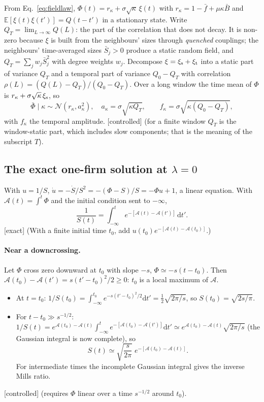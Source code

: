 \documentclass[11pt]{article}
\newcommand{\E}{\mathbb E}
\newcommand{\Sb}{\bar S}
\newcommand{\fb}{\bar f}
\newcommand{\dd}{\mathrm d}
\newcommand{\exact}{\textsf{\small[exact]}}
\newcommand{\controlled}{\textsf{\small[controlled]}}
\begin{document}
From Eq.~\eqref{eq:fieldlaw}, $\Phi(t)=r_\kappa+\sigma\sqrt\kappa\,\xi(t)$ with $r_\kappa=1-\fb+\mu\kappa\bar B$ and
$\E[\xi(t)\xi(t')]=Q(t-t')$ in a stationary state.  Write $Q_T=\lim_{L\to\infty}Q(L)$: the part of the
correlation that does not decay.  It is non-zero because $\xi$ is built from the neighbours' sizes through
\emph{quenched} couplings; the neighbours' time-averaged sizes $\Sb_j>0$ produce a static random field, and
$Q_T=\sum_jw_j\Sb_j^2$ with degree weights $w_j$.  Decompose $\xi=\xi_{\rm s}+\xi_{\rm t}$ into a static part of variance
$Q_T$ and a temporal part of variance $Q_0-Q_T$ with correlation $\rho(L)=(Q(L)-Q_T)/(Q_0-Q_T)$.  Over a long window the
time mean of $\Phi$ is $r_\kappa+\sigma\sqrt\kappa\,\xi_{\rm s}$, so
\begin{equation}
\bar\Phi\mid\kappa\sim\mathcal N(r_\kappa,a_\kappa^2),\quad a_\kappa=\sigma\sqrt{\kappa Q_T},\qquad f_\kappa=\sigma\sqrt{\kappa(Q_0-Q_T)},
\end{equation}
with $f_\kappa$ the temporal amplitude.  \controlled{} (for a finite window $Q_T$ is the window-static part, which
includes slow components; that is the meaning of the subscript $T$).

\subsection{The exact one-firm solution at $\lambda=0$}

With $u=1/S$, $\dot u=-\dot S/S^2=-(\Phi-S)/S=-\Phi u+1$, a linear equation.  With $\mathcal A(t)=\int^t\Phi$ and the
initial condition sent to $-\infty$,
\begin{equation}
\frac1{S(t)}=\int_{-\infty}^te^{-[\mathcal A(t)-\mathcal A(t')]}\,\dd t' .
\end{equation}
\exact{}  (With a finite initial time $t_0$, add $u(t_0)e^{-[\mathcal A(t)-\mathcal A(t_0)]}$.)

\paragraph{Near a downcrossing.}  Let $\Phi$ cross zero downward at $t_0$ with slope $-s$, $\Phi\simeq-s(t-t_0)$.  Then
$\mathcal A(t_0)-\mathcal A(t')=s(t'-t_0)^2/2\ge0$: $t_0$ is a local maximum of $\mathcal A$.
\begin{itemize}
\item At $t=t_0$: $1/S(t_0)=\int_{-\infty}^{t_0}e^{-s(t'-t_0)^2/2}\dd t'=\tfrac12\sqrt{2\pi/s}$, so $S(t_0)=\sqrt{2s/\pi}$.
\item For $t-t_0\gg s^{-1/2}$: $1/S(t)=e^{\mathcal A(t_0)-\mathcal A(t)}\int_{-\infty}^te^{-[\mathcal A(t_0)-\mathcal A(t')]}\dd t'\simeq e^{\mathcal A(t_0)-\mathcal A(t)}\sqrt{2\pi/s}$
  (the Gaussian integral is now complete), so
  \begin{equation}
  S(t)\simeq\sqrt{\frac{s}{2\pi}}\;e^{-[\mathcal A(t_0)-\mathcal A(t)]}.
  \end{equation}
  For intermediate times the incomplete Gaussian integral gives the inverse Mills ratio.
\end{itemize}
\controlled{} (requires $\Phi$ linear over a time $s^{-1/2}$ around $t_0$).
\end{document}
